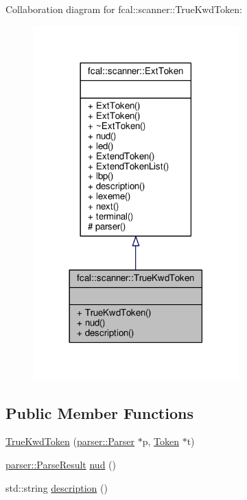 Collaboration diagram for fcal\+:\+:scanner\+:\+:True\+Kwd\+Token\+:
\nopagebreak
\begin{figure}[H]
\begin{center}
\leavevmode
\includegraphics[width=225pt]{classfcal_1_1scanner_1_1TrueKwdToken__coll__graph}
\end{center}
\end{figure}
\subsection*{Public Member Functions}
\begin{DoxyCompactItemize}
\item 
\hyperlink{classfcal_1_1scanner_1_1TrueKwdToken_a69b9cddc8e90e93984aadf7306159661}{True\+Kwd\+Token} (\hyperlink{classfcal_1_1parser_1_1Parser}{parser\+::\+Parser} $\ast$p, \hyperlink{classfcal_1_1scanner_1_1Token}{Token} $\ast$t)
\item 
\hyperlink{classfcal_1_1parser_1_1ParseResult}{parser\+::\+Parse\+Result} \hyperlink{classfcal_1_1scanner_1_1TrueKwdToken_ad3813f27375db4cc57df86bf8a446546}{nud} ()
\item 
std\+::string \hyperlink{classfcal_1_1scanner_1_1TrueKwdToken_a18a6762dac43654ff2df03c3c19d692e}{description} ()
\end{DoxyCompactItemize}
